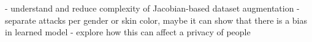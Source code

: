 - understand and reduce complexity of Jacobian-based dataset augmentation
- separate attacks per gender or skin color, maybe it can show that there is a bias in learned model
- explore how this can affect a privacy of people